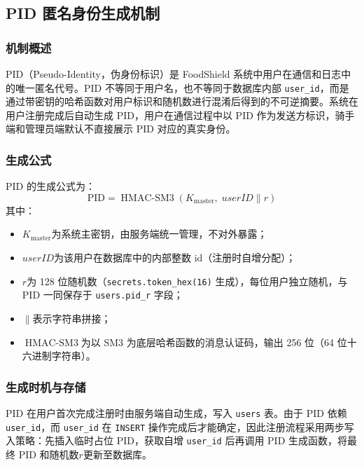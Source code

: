 \subsection{PID 匿名身份生成机制}
\label{subsec:pid}

\subsubsection*{机制概述}

PID（Pseudo-Identity，伪身份标识）是 FoodShield 系统中用户在通信和日志中的唯一匿名代号。PID 不等同于用户名，也不等同于数据库内部 \texttt{user\_id}，而是通过带密钥的哈希函数对用户标识和随机数进行混淆后得到的不可逆摘要。系统在用户注册完成后自动生成 PID，用户在通信过程中以 PID 作为发送方标识，骑手端和管理员端默认不直接展示 PID 对应的真实身份。

\subsubsection*{生成公式}

PID 的生成公式为：
\[
  \mathrm{PID} = \operatorname{HMAC\text{-}SM3}(K_{\mathrm{master}},\; \mathit{userID} \| r)
\]
其中：
\begin{itemize}[leftmargin=2em]
  \item$K_{\mathrm{master}}$为系统主密钥，由服务端统一管理，不对外暴露；
  \item$\mathit{userID}$为该用户在数据库中的内部整数 id（注册时自增分配）；
  \item$r$为 128 位随机数（\texttt{secrets.token\_hex(16)} 生成），每位用户独立随机，与 PID 一同保存于 \texttt{users.pid\_r} 字段；
  \item$\|$表示字符串拼接；
  \item$\operatorname{HMAC\text{-}SM3}$为以 SM3 为底层哈希函数的消息认证码，输出 256 位（64 位十六进制字符串）。
\end{itemize}

\subsubsection*{生成时机与存储}

PID 在用户首次完成注册时由服务端自动生成，写入 \texttt{users} 表。由于 PID 依赖 \texttt{user\_id}，而 \texttt{user\_id} 在 \texttt{INSERT} 操作完成后才能确定，因此注册流程采用两步写入策略：先插入临时占位 PID，获取自增 \texttt{user\_id} 后再调用 PID 生成函数，将最终 PID 和随机数$r$更新至数据库。

